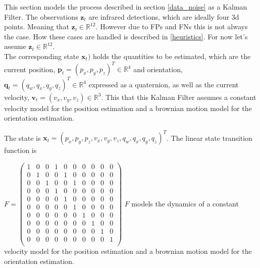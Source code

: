\documentclass{article}
\begin{document}
This section models the process described in section \ref{data_noise} as a Kalman Filter. The observations $\mathbf{z}_t$ are infrared detections, which are ideally four 3d points. Meaning that $\mathbf{z}_t \in \mathbb{R}^{12}$. However due to FPs and FNs this is not always the case. How these cases are handled is described in \ref{heuristics}. For now let's assume  $\mathbf{z}_t \in \mathbb{R}^{12}$. \\
The corresponding state $\mathbf{x}_t)$ holds the quantities to be estimated, which are the current position, $\mathbf{p}_t = (p_x, p_y, p_z)^T \in \mathbb{R}^4$ and orientation, $\mathbf{q}_t=(q_w, q_x, q_y, q_z)^T \in \mathbb{R}^4$ expressed as a quaternion, %
as well as the current velocity, $\mathbf{v}_t=(v_x, v_y, v_z) \in \mathbb{R}^3$. This that this Kalman Filter assumes a constant velocity model for the position estimation and a brownian motion model for the orientation estimation. %

The state is $\mathbf{x}_t = (p_x, p_y, p_z, v_x, v_y, v_z, q_w, q_x, q_y, q_z)^T$.
The linear state transition function is 

$F =
\begin{pmatrix}
1 & 0 & 0 & 1 & 0 & 0 & 0 & 0 & 0 & 0 \\
0 & 1 & 0 & 0 & 1 & 0 & 0 & 0 & 0 & 0 \\
0 & 0 & 1 & 0 & 0 & 1 & 0 & 0 & 0 & 0 \\
0 & 0 & 0 & 1 & 0 & 0 & 0 & 0 & 0 & 0 \\
0 & 0 & 0 & 0 & 1 & 0 & 0 & 0 & 0 & 0 \\
0 & 0 & 0 & 0 & 0 & 1 & 0 & 0 & 0 & 0 \\
0 & 0 & 0 & 0 & 0 & 0 & 1 & 0 & 0 & 0 \\
0 & 0 & 0 & 0 & 0 & 0 & 0 & 1 & 0 & 0 \\
0 & 0 & 0 & 0 & 0 & 0 & 0 & 0 & 1 & 0 \\
0 & 0 & 0 & 0 & 0 & 0 & 0 & 0 & 0 & 1 \\
\end{pmatrix}
$
$F$ models the dynamics of a constant velocity model for the position estimation and a brownian motion model for the orientation estimation. 
\end{document}
